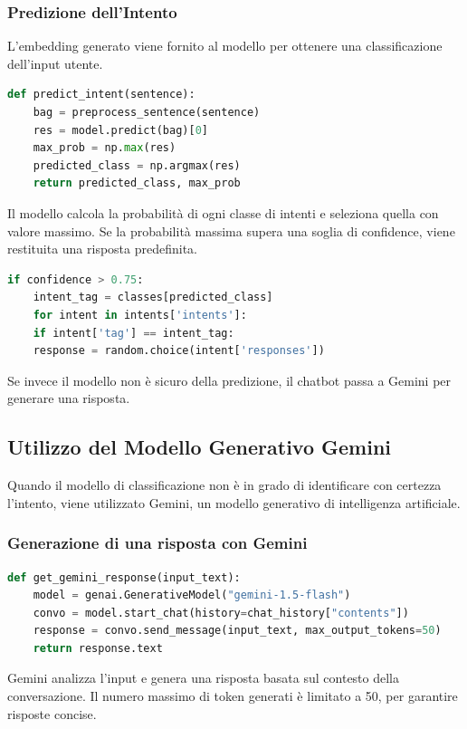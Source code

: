 \documentclass[12pt, letterpaper]{article}
\begin{document}
\subsubsection{Predizione dell'Intento}
L'embedding generato viene fornito al modello per ottenere una classificazione dell'input utente.

\begin{lstlisting}[language=Python]
	def predict_intent(sentence):
	bag = preprocess_sentence(sentence)
	res = model.predict(bag)[0]
	max_prob = np.max(res)
	predicted_class = np.argmax(res)
	return predicted_class, max_prob
\end{lstlisting}
Il modello calcola la probabilità di ogni classe di intenti e seleziona quella con valore massimo. Se la probabilità massima supera una soglia di confidence, viene restituita una risposta predefinita.
\begin{lstlisting}[language=Python]
	if confidence > 0.75:
	intent_tag = classes[predicted_class]
	for intent in intents['intents']:
	if intent['tag'] == intent_tag:
	response = random.choice(intent['responses'])
\end{lstlisting}
Se invece il modello non è sicuro della predizione, il chatbot passa a Gemini per generare una risposta.

\subsection{Utilizzo del Modello Generativo Gemini}
Quando il modello di classificazione non è in grado di identificare con certezza l'intento, viene utilizzato Gemini, un modello generativo di intelligenza artificiale.

\subsubsection{Generazione di una risposta con Gemini}
\begin{lstlisting}[language=Python]
	def get_gemini_response(input_text):
	model = genai.GenerativeModel("gemini-1.5-flash")
	convo = model.start_chat(history=chat_history["contents"])
	response = convo.send_message(input_text, max_output_tokens=50)
	return response.text
\end{lstlisting}
Gemini analizza l'input e genera una risposta basata sul contesto della conversazione. Il numero massimo di token generati è limitato a 50, per garantire risposte concise.
\end{document}
